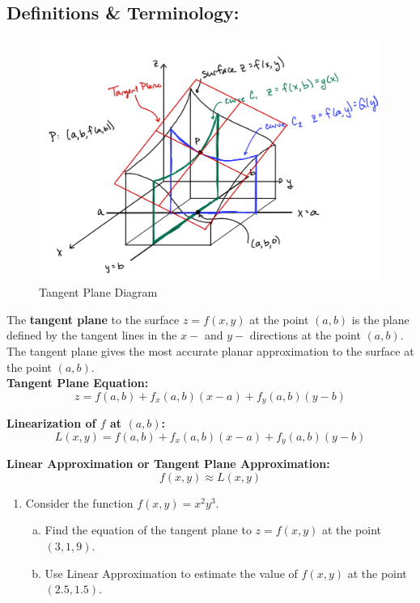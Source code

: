 
\subsection*{Definitions \& Terminology:}


\begin{figure}[htbp]
\includegraphics[width=.5\textwidth]{Tangent-Plane.png}
\caption{Tangent Plane Diagram}
\end{figure}


The \textbf{tangent plane} to the surface \(z=f(x,y)\) at the point \((a,b)\) is the plane defined by the tangent lines in the \(x-\) and \(y-\) directions at the point \((a,b)\).\\

The tangent plane gives the most accurate planar approximation to the surface at the point \((a,b)\).\\

\textbf{Tangent Plane Equation:}
\[z = f(a,b) + f_x(a,b)(x-a) + f_y(a,b)(y-b)\]

\textbf{Linearization of \(f\) at \((a,b)\):}
\[L(x,y) = f(a,b) + f_x(a,b)(x-a) + f_y(a,b)(y-b)\]

\textbf{Linear Approximation or Tangent Plane Approximation:}
\[f(x,y) \approx L(x,y) \]











\begin{enumerate}[{Example} 1: ]
\item Consider the function \(f(x,y) = x^2y^3\).
\begin{enumerate}[(a)]
\item Find the equation of the tangent plane to \(z=f(x,y)\) at the point \((3,1,9)\).
\item Use Linear Approximation to estimate the value of \(f(x,y)\) at the point \((2.5,1.5)\).
\end{enumerate}

\end{enumerate}

